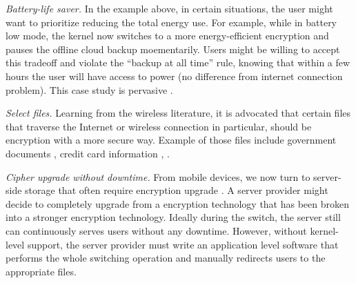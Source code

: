 {\em Battery-life saver.}  In the example above, in certain situations,
the user might want to prioritize reducing the total energy use.  For
example, while in battery low mode, the kernel now switches to a more
energy-efficient encryption and pauses the offline cloud backup
moementarily.  Users might be willing to accept this tradeoff and violate
the ``backup at all time'' rule, knowing that within a few hours the user
will have access to power (no difference from internet connection
problem).  This case study is pervasive
\cite{hackernews-???, many-more??}.

{\em Select files.}  Learning from the wireless literature, it is
advocated that certain files that traverse the Internet or wireless
connection in particular, should be encryption with a more secure way.
Example of those files include government documents
\cite{citation-to-this-example}, credit card information \cite{a}, \xxx
\cite{a, b, c}.


{\em Cipher upgrade without downtime.}  From mobile devices, we now turn
to server-side storage that often require encryption upgrade
\cite{some-citations}.  A server provider might decide to completely
upgrade from a encryption technology that has been broken into a stronger
encryption technology.  Ideally during the switch, the server still can
continuously serves users without any downtime.  However, without
kernel-level support, the server provider must write an application level
software that performs the whole switching operation and manually
redirects users to the appropriate files.

